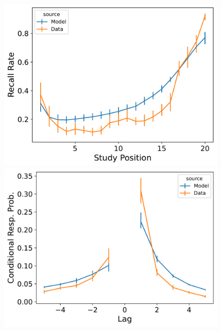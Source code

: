 \documentclass[
  letterpaper,
  11pt,
  english,
  singlespacing,
  headsepline]{MastersDoctoralThesis}
\begin{document}
\begin{figure}
\begin{minipage}{0.33\linewidth}
\includegraphics{icmr_figures/Murdock1962_TraceScalingCMR_Model_Fitting_LL20_spc-1.png}\end{minipage}%
\newline
\begin{minipage}{0.33\linewidth}
\includegraphics{icmr_figures/Murdock1962_MultiScalingCMR_Model_Fitting_LL20_crp-1.png}\end{minipage}%
%
\begin{minipage}{0.33\linewidth}

\end{minipage}
\end{figure}
\end{document}
